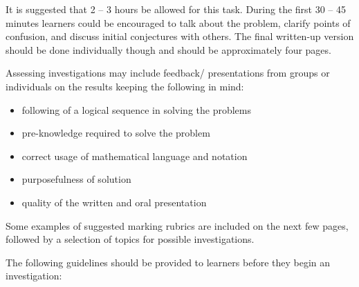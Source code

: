 It is suggested that 2 – 3 hours be allowed for this task.  During the first 30 – 45 minutes learners could be encouraged to talk about the problem, clarify points of confusion, and discuss initial conjectures with others. The final written-up version should be done individually though and should be approximately four pages. \par 


Assessing investigations may include feedback/ presentations from groups or individuals on the results keeping the following in mind:
\begin{itemize}[noitemsep]
\item following of a logical sequence in solving the problems
\item pre-knowledge required to solve the problem
\item correct usage of mathematical language and notation
\item purposefulness of solution
\item quality of the written and oral presentation 
\end{itemize}
Some examples of suggested marking rubrics are included on the next few pages, followed by a selection of topics for possible investigations. \par

The following guidelines should be provided to learners before they begin an investigation: \par

